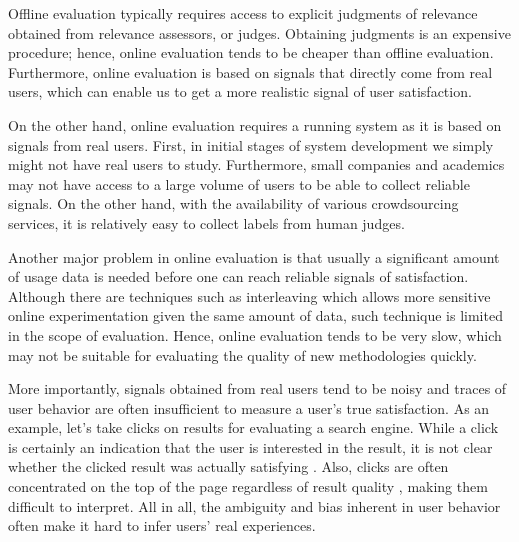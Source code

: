 Offline evaluation typically requires access to explicit judgments of relevance obtained from relevance assessors, or judges. Obtaining judgments is an expensive procedure; hence, online evaluation tends to be cheaper than offline evaluation. Furthermore, online evaluation is based on signals that directly come from real users, which can enable us to get a more realistic signal of user satisfaction. 

On the other hand, online evaluation requires a running system as it is based on signals from real users. First, in initial stages of system development we simply might not have real users to study. Furthermore, small companies and academics may not have access to a large volume of users to be able to collect reliable signals. On the other hand, with the availability of various crowdsourcing services, it is relatively easy to collect labels from human judges.

Another major problem in online evaluation is that usually a significant amount of usage data is needed before one can reach reliable signals of satisfaction. Although there are techniques such as interleaving \citep{radl:comp10} which allows more sensitive online experimentation given the same amount of data, such technique is limited in the scope of evaluation. Hence, online evaluation tends to be very slow, which may not be suitable for evaluating the quality of new methodologies quickly. %

More importantly, signals obtained from real users tend to be noisy and traces of user behavior are often insufficient to measure a user's true satisfaction. As an example, let's take clicks on results for evaluating a search engine. While a click is certainly an indication that the user is interested in the result, it is not clear whether the clicked result was actually satisfying \citep{Kim2016}. Also, clicks are often concentrated on the top of the page regardless of result quality \citep{radlinski2006minimally}, making them difficult to interpret. All in all, the ambiguity and bias inherent in user behavior often make it hard to infer users' real experiences.   

